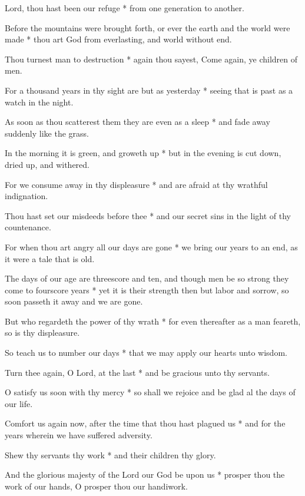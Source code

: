 Lord, thou hast been our refuge * from one generation to another.

Before the mountains were brought forth, or ever the earth and the world were made * thou art God from everlasting, and world without end.

Thou turnest man to destruction * again thou sayest, Come again, ye children of men.

For a thousand years in thy sight are but as yesterday * seeing that is past as a watch in the night.

As soon as thou scatterest them they are even as a sleep * and fade away suddenly like the grass.

In the morning it is green, and groweth up * but in the evening is cut down, dried up, and withered.

For we consume away in thy displeasure * and are afraid at thy wrathful indignation.

Thou hast set our misdeeds before thee * and our secret sins in the light of thy countenance.

For when thou art angry all our days are gone * we bring our years to an end, as it were a tale that is old.

The days of our age are threescore and ten, and though men be so strong they come to fourscore years * yet it is their strength then but labor and sorrow, so soon passeth it away and we are gone.

But who regardeth the power of thy wrath * for even thereafter as a man feareth, so is thy displeasure.

So teach us to number our days * that we may apply our hearts unto wisdom.

Turn thee again, O Lord, at the last * and be gracious unto thy servants.

O satisfy us soon with thy mercy * so shall we rejoice and be glad al the days of our life.

Comfort us again now, after the time that thou hast plagued us * and for the years wherein we have suffered adversity.

Shew thy servants thy work * and their children thy glory.

And the glorious majesty of the Lord our God be upon us * prosper thou the work of our hands, O prosper thou our handiwork.